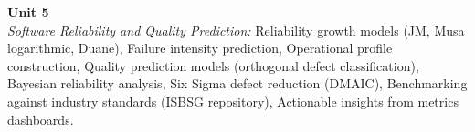 \vspace{0.3cm}

\noindent\textbf{Unit 5} \\
\textit{Software Reliability and Quality Prediction:} Reliability growth models (JM, Musa logarithmic, Duane), Failure intensity prediction, Operational profile construction, Quality prediction models (orthogonal defect classification), Bayesian reliability analysis, Six Sigma defect reduction (DMAIC), Benchmarking against industry standards (ISBSG repository), Actionable insights from metrics dashboards.

\newpage
{}
